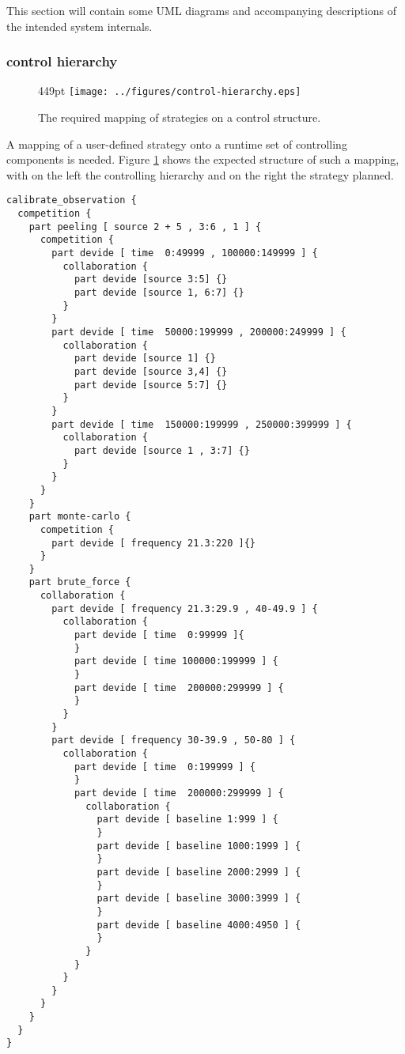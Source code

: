 \documentclass[]{lofar}
\begin{document}
      This section will contain some UML diagrams and accompanying
      descriptions of the intended system internals.

      \subsubsection{control hierarchy}

      \begin{figure}{449pt}
        \texttt{[image: ../figures/control-hierarchy.eps]}
        \hypertarget{fig:control-hierarchy}{}
        \caption{The required mapping of strategies on a control structure.\label{fig:control-hierarchy}}
      \end{figure}

      A mapping of a user-defined strategy onto a runtime set of
      controlling components is needed. Figure
      \hyperlink{fig:control-hierarchy}{\ref{fig:control-hierarchy}}
      shows the expected structure of such a mapping, with on the left
      the controlling hierarchy and on the right the strategy planned.

\begin{verbatim}
calibrate_observation {
  competition {
    part peeling [ source 2 + 5 , 3:6 , 1 ] {
      competition {
        part devide [ time  0:49999 , 100000:149999 ] {
          collaboration {
            part devide [source 3:5] {}
            part devide [source 1, 6:7] {}
          }
        }
        part devide [ time  50000:199999 , 200000:249999 ] {
          collaboration {
            part devide [source 1] {}
            part devide [source 3,4] {}
            part devide [source 5:7] {}
          }
        }
        part devide [ time  150000:199999 , 250000:399999 ] {
          collaboration {
            part devide [source 1 , 3:7] {}
          }
        }
      }
    }
    part monte-carlo {
      competition {
        part devide [ frequency 21.3:220 ]{}
      }
    }
    part brute_force {
      collaboration {
        part devide [ frequency 21.3:29.9 , 40-49.9 ] {
          collaboration {
            part devide [ time  0:99999 ]{
            }
            part devide [ time 100000:199999 ] {
            }
            part devide [ time  200000:299999 ] {
            }
          }
        }
        part devide [ frequency 30-39.9 , 50-80 ] {
          collaboration {
            part devide [ time  0:199999 ] {
            }
            part devide [ time  200000:299999 ] {
              collaboration {
                part devide [ baseline 1:999 ] {
                }
                part devide [ baseline 1000:1999 ] {
                }
                part devide [ baseline 2000:2999 ] {
                }
                part devide [ baseline 3000:3999 ] {
                }
                part devide [ baseline 4000:4950 ] {
                }
              }
            }
          }
        }
      }
    }
  }
}
\end{verbatim}
\end{document}
